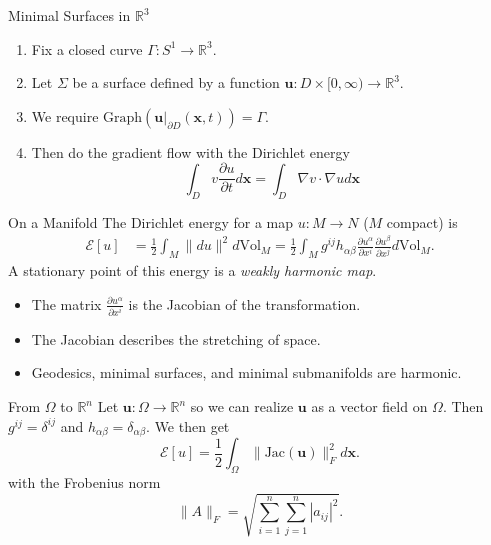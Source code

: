 \documentclass[usenames,dvipsnames]{beamer}
\theoremstyle{definition}
\theoremstyle{theorem}
\newcommand{\R}{\mathbb{R}}
\begin{document}
    
    \begin{frame}{Minimal Surfaces in $\R^3$}
    \begin{enumerate}[1.]
        \item Fix a closed curve $\Gamma \colon S^1 \to \R^3$.
        \item Let $\Sigma$ be a surface defined by a function $\mathbf{u}\colon D \times [0,\infty) \to \R^3$.
        \item We require $\textrm{Graph}(\mathbf{u}|_{\partial D}(\mathbf{x},t))=\Gamma$.
        \item Then do the gradient flow with the Dirichlet energy
        \[
        \int_{D} v \frac{\partial u}{\partial t} d\mathbf{x} = \int_{D} \nabla v\cdot {\nabla u} d\mathbf{x}
        \]
    \end{enumerate}
    \end{frame}
    
    \begin{frame}{On a Manifold}
        The Dirichlet energy for a map $u \colon M \to N$ ($M$ compact) is
        \begin{align*}
        \mathcal{E}[u] &=\frac{1}{2} \int_{M} \|du\|^2 d\textrm{Vol}_M = \frac{1}{2} \int_{M}g^{ij}h_{\alpha \beta} \frac{\partial u^\alpha}{\partial x^i}\frac{\partial u^\beta}{\partial x^j}d\textrm{Vol}_M.
        \end{align*}
        A stationary point of this energy is a \emph{weakly harmonic map}.
        \begin{itemize}
            \item The matrix $\frac{\partial u^\alpha}{\partial x^i}$ is the Jacobian of the transformation.
            \item The Jacobian describes the stretching of space.
            \item Geodesics, minimal surfaces, and minimal submanifolds are harmonic.
        \end{itemize}
    \end{frame}
    
    
    \begin{frame}{From $\Omega$ to $\R^n$}
        Let $\mathbf{u}\colon \Omega \to \R^n$ so we can realize $\mathbf{u}$ as a vector field on $\Omega$. Then $g^{ij}=\delta^{ij}$ and $h_{\alpha \beta}=\delta_{\alpha \beta}$. We then get
        \[
        \mathcal{E}[u] = \frac{1}{2} \int_{\Omega} \|\textrm{Jac}(\mathbf{u})\|_{F}^2 d\mathbf{x}.
        \]
        with the Frobenius norm
        \[
        \|A\|_F = \sqrt{\sum_{i=1}^n \sum_{j=1}^n |a_{ij}|^2}.
        \]
    \end{frame}
    
\end{document}
